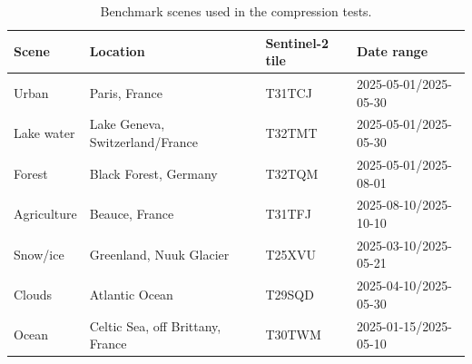 \begin{table}[t]
\centering
\caption{Benchmark scenes used in the compression tests.}
\label{tab:benchmark_scenes}
\begin{tabular}{@{}llll@{}}
\toprule
Scene & Location & Sentinel-2 tile & Date range \\
\midrule
Urban & Paris, France & T31TCJ & 2025-05-01/2025-05-30 \\
Lake water & Lake Geneva, Switzerland/France & T32TMT & 2025-05-01/2025-05-30 \\
Forest & Black Forest, Germany & T32TQM & 2025-05-01/2025-08-01 \\
Agriculture & Beauce, France & T31TFJ & 2025-08-10/2025-10-10 \\
Snow/ice & Greenland, Nuuk Glacier & T25XVU & 2025-03-10/2025-05-21 \\
Clouds & Atlantic Ocean & T29SQD & 2025-04-10/2025-05-30 \\
Ocean & Celtic Sea, off Brittany, France & T30TWM & 2025-01-15/2025-05-10 \\
\bottomrule
\end{tabular}
\end{table}
